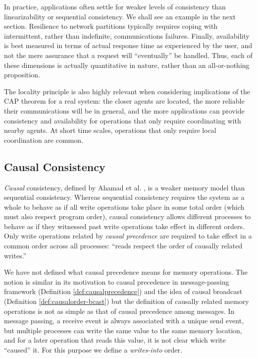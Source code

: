 \documentclass[]             %
{NASA}                       %
\theoremstyle{definition}
\begin{document}
In practice, applications often settle for weaker levels of
consistency than linearizability or sequential consistency. We shall
see an example in the next section. Resilience to network partitions
typically requires coping with intermittent, rather than indefinite,
communications failures. Finally, availability is best measured in
terms of actual response time as experienced by the user, and not the
mere assurance that a request will ``eventually'' be handled. Thus,
each of these dimensions is actually quantitative in nature, rather
than an all-or-nothing proposition.

The locality principle is also highly relevant when considering
implications of the CAP theorem for a real system: the closer agents
are located, the more reliable their communications will be in
general, and the more applications can provide consistency and
availability for operations that only require coordinating with nearby
agents. At short time scales, operations that only require local
coordination are common.

\subsection{Causal Consistency}
\label{ssec:causal-memory}
\emph{Causal} consistency, defined by Ahamad et
al. \cite{1995:causal-memory}, is a weaker memory model than
sequential consistency. Whereas sequential consistency requires the
system as a whole to behave as if all write operations take place in
some total order (which must also respect program order), causal
consistency allows different processes to behave as if they witnessed
past write operations take effect in different orders. Only write
operations related by \emph{causal precedence} are required to take
effect in a common order across all processes: ``reads respect the
order of causally related writes.''  \cite{1995:causal-memory}

We have not defined what causal precedence means for memory
operations. The notion is similar in its motivation to causal
precedence in message-passing framework (Definition
\ref{def:causalprecedence}) and the idea of causal broadcast
(Definition \ref{def:causalorder-bcast}) but the definition of
causally related memory operations is not as simple as that of causal
precedence among messages. In message passing, a receive event is
always associated with a unique send event, but multiple processes can
write the same value to the same memory location, and for a later
operation that reads this value, it is not clear which write
``caused'' it. For this purpose we define a \emph{writes-into} order.
\end{document}
